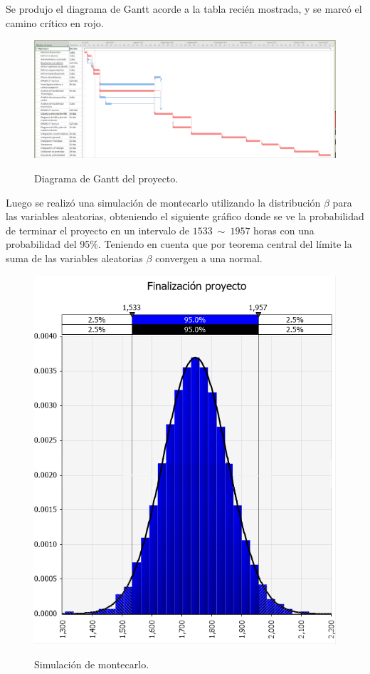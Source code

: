 

Se produjo el diagrama de Gantt acorde a la tabla recién mostrada, y se marcó el camino crítico en rojo.
\begin{figure}[H]
	\centering
	\includegraphics[width=1\linewidth]{ImagenesFactibilidad/project}
	\label{fig:gantt}
	\caption{Diagrama de Gantt del proyecto.}
\end{figure}

Luego se realizó una simulación de montecarlo utilizando la distribución $\beta$ para las variables aleatorias, obteniendo el siguiente gráfico donde se ve la probabilidad de terminar el proyecto en un intervalo de $1533 \ \sim \ 1957 $ horas con una probabilidad del 95$\%$. Teniendo en cuenta que por teorema central del límite la suma de las variables aleatorias $\beta$ convergen a una normal.
\begin{figure}[H]
	\centering
	\includegraphics[width=0.5\linewidth]{ImagenesFactibilidad/montecarlo}
	\label{fig:montecarlo_tiempos}
	\caption{Simulación de montecarlo.}
\end{figure}

